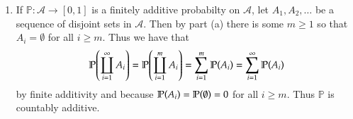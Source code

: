 \documentclass[12pt]{article}
\theoremstyle{definitionstyle}
\newcommand{\1}{\mathds 1}
\renewcommand{\P}{\mathbb P \qty}
\begin{document}
\begin{enumerate}
\begin{enumerate}[label=\alph*)]
            \item If $\mathbb P: \mathscr A \to [0,1]$ is a finitely additive probabilty on $\mathscr A$, let $A_1, A_2, \ldots$ be a sequence of disjoint sets in $\mathscr A$. Then by part (a) there is some $m \geq 1$ so that $A_i = \emptyset$ for all $i \geq m$. Thus we have that 
            \begin{align*}
                \P(\coprod_{i=1}^\infty A_i) = \P(\coprod_{i=1}^m A_i) = \sum_{i=1}^m \P(A_i) = \sum_{i=1}^\infty \P(A_i)
            \end{align*} 
            by finite additivity and because $\P(A_i) = \P(\emptyset) = 0$ for all $i \geq m$. Thus $\mathbb P$ is countably additive.
        \end{enumerate}
    \end{enumerate}    
\end{document}
